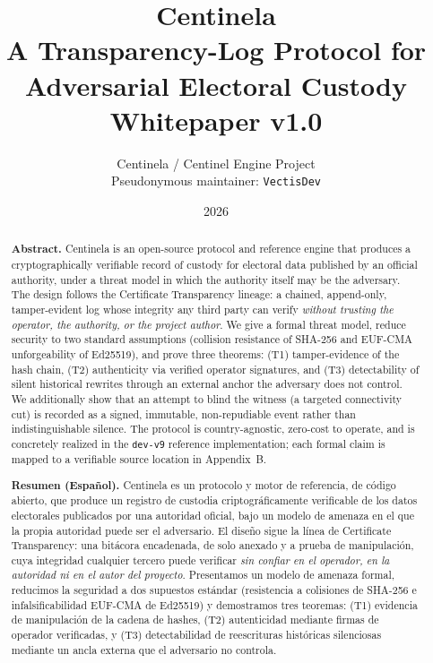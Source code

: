 \documentclass[11pt,a4paper]{article}
\title{\textbf{Centinela}\\[4pt]
\large A Transparency-Log Protocol for Adversarial Electoral Custody\\[2pt]
\normalsize Whitepaper v1.0}
\author{Centinela / Centinel Engine Project\\
\small Pseudonymous maintainer: \texttt{VectisDev}}
\date{2026}
\theoremstyle{plain}
\theoremstyle{definition}
\theoremstyle{remark}
\begin{document}
\maketitle
\thispagestyle{fancy}

\begin{abstract}
\noindent\textbf{Abstract.} Centinela is an open-source protocol and
reference engine that produces a cryptographically verifiable record of
custody for electoral data published by an official authority, under a
threat model in which the authority itself may be the adversary. The
design follows the Certificate Transparency lineage: a chained,
append-only, tamper-evident log whose integrity any third party can
verify \emph{without trusting the operator, the authority, or the
project author}. We give a formal threat model, reduce security to two
standard assumptions (collision resistance of SHA-256 and EUF-CMA
unforgeability of Ed25519), and prove three theorems: (T1)
tamper-evidence of the hash chain, (T2) authenticity via verified
operator signatures, and (T3) detectability of silent historical
rewrites through an external anchor the adversary does not control. We
additionally show that an attempt to blind the witness (a targeted
connectivity cut) is recorded as a signed, immutable, non-repudiable
event rather than indistinguishable silence. The protocol is
country-agnostic, zero-cost to operate, and is concretely realized in
the \texttt{dev-v9} reference implementation; each formal claim is
mapped to a verifiable source location in Appendix~B.

\bigskip
\noindent\textbf{Resumen (Espa\~nol).} Centinela es un protocolo y motor
de referencia, de c\'odigo abierto, que produce un registro de custodia
criptogr\'aficamente verificable de los datos electorales publicados por
una autoridad oficial, bajo un modelo de amenaza en el que la propia
autoridad puede ser el adversario. El dise\~no sigue la l\'inea de
Certificate Transparency: una bit\'acora encadenada, de solo anexado y
a prueba de manipulaci\'on, cuya integridad cualquier tercero puede
verificar \emph{sin confiar en el operador, en la autoridad ni en el
autor del proyecto}. Presentamos un modelo de amenaza formal, reducimos
la seguridad a dos supuestos est\'andar (resistencia a colisiones de
SHA-256 e infalsificabilidad EUF-CMA de Ed25519) y demostramos tres
teoremas: (T1) evidencia de manipulaci\'on de la cadena de hashes, (T2)
autenticidad mediante firmas de operador verificadas, y (T3)
detectabilidad de reescrituras hist\'oricas silenciosas mediante un
ancla externa que el adversario no controla.
\end{abstract}
\end{document}
